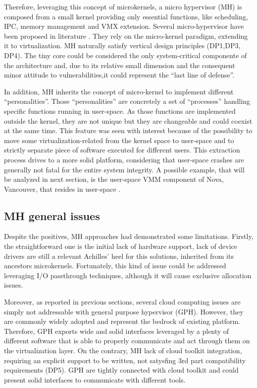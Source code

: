 \documentclass{acm_proc_article-sp} %
\begin{document}
Therefore, leveraging this concept of microkernels, a micro hypervisor (MH) is composed from a small kernel providing only essential functions, like scheduling, IPC, memory management and VMX extension. Several micro-hypervisor have been proposed in literature \cite{xmhf, nova}. They rely on the micro-kernel paradigm, extending it to virtualization. MH naturally satisfy vertical design principles (DP1,DP3, DP4). The tiny core could be considered the only system-critical componente of the architecture and, due to its relative small dimension and the consequent minor attitude to vulnerabilities,it could represent the ``last line of defense''.

In addition, MH inherits the concept of micro-kernel to implement different ``personalities''. Those ``personalities'' are concretely a set of ``processes'' handling specific functions running in user-space. As those functions are implemented outside the kernel, they are not unique but they are changeable and could coexist at the same time. This feature was seen with interest because of the possibility to move some virtualization-related from the kernel space to user-space and to strictly separate piece of software executed for different users. This extraction process drives to a more solid platform, considering that user-space crashes are generally not fatal for the entire system integrity.  A possible example, that will be analyzed in next section, is the user-space VMM component of Nova, Vancouver, that resides in user-space \cite{nova}.

\subsection {MH general issues}

Despite the positives, MH approaches had demonstrated some limitations. Firstly, the straightforward one is the initial lack of hardware support, lack of device drivers are still a relevant Achilles' heel for this solutions, inherited from its ancestors microkernels. Fortunately, this kind of issue could be addressed leveraging I/O passthrough techniques, although it will cause exclusive allocation issues.

Moreover, as reported in previous sections, several cloud computing issues are simply not addressable with general purpose hypervisor (GPH). However, they are commonly widely adopted and represent the bedrock of existing platform. Therefore, GPH exports wide and solid interfaces leveraged by a plenty of different software that is able to properly communicate and act through them on the virtualization layer. On the contrary, MH lack of cloud toolkit integration, requiring an explicit support to be written, not satysfing 3rd part compatibility requirements (DP5). GPH are tightly connected with cloud toolkit and could present solid interfaces to communicate with different tools. 
\end{document}
